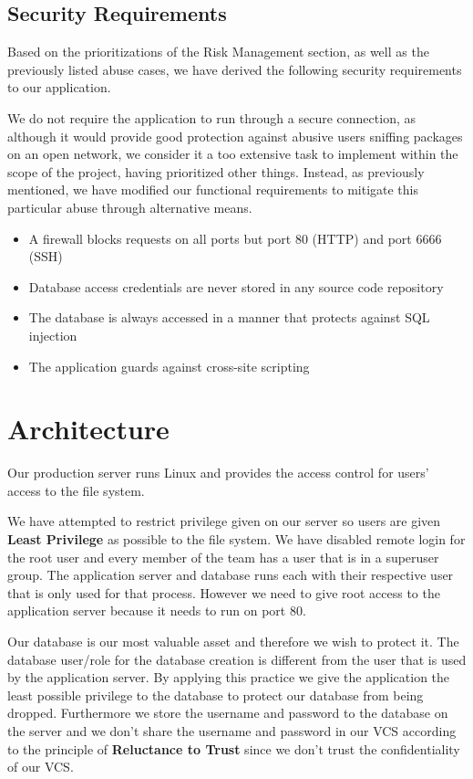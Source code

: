 \documentclass[a4paper]{article}
\begin{document}
\subsection{Security Requirements}
Based on the prioritizations of the Risk Management section, as well as the previously listed abuse cases, we have derived the following security requirements to our application.

We do not require the application to run through a secure connection, as although it would provide good protection against abusive users sniffing packages on an open network, we consider it a too extensive task to implement within the scope of the project, having prioritized other things. Instead, as previously mentioned, we have modified our functional requirements to mitigate this particular abuse through alternative means.
\begin{itemize}
\item A firewall blocks requests on all ports but port 80 (HTTP) and port 6666 (SSH)
\item Database access credentials are never stored in any source code repository
\item The database is always accessed in a manner that protects against SQL injection
\item The application guards against cross-site scripting
\end{itemize}

\section{Architecture}

Our production server runs Linux and provides the access control for users' access to the file system.

We have attempted to restrict privilege given on our server so users are given 
\textbf{Least Privilege} as possible to the file system. We have disabled remote login for the root user and every member of the team has a user that is in a superuser group. The application server and database runs each with their respective user that is only used for that process. However we need to give root access to the application server because it needs to run on port 80.


Our database is our most valuable asset and therefore we wish to protect it. The database user/role for the database creation is different from the user that is used by the application server. By applying this practice we give the application the least possible privilege to the database to protect our database from being dropped. Furthermore we store the username and password to the database on the server and we don't share the username and password in our VCS according to the principle of \textbf{Reluctance to Trust} since we don't trust the confidentiality of our VCS.
\end{document}
